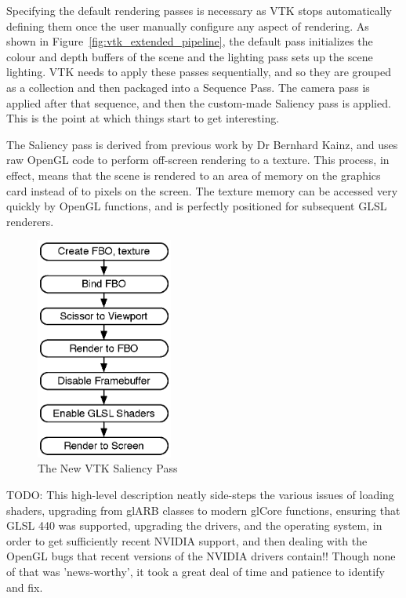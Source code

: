\documentclass[MSc,paper=a4,pagesize=auto]{icldt}
\begin{document}
Specifying the default rendering passes is necessary as VTK stops automatically defining them once the user manually configure any aspect of rendering. As shown in Figure~\ref{fig:vtk_extended_pipeline}, the default pass initializes the colour and depth buffers of the scene and the lighting pass sets up the scene lighting. VTK needs to apply these passes sequentially, and so they are grouped as a collection and then packaged into a Sequence Pass. The camera pass is applied after that sequence, and then the custom-made Saliency pass is applied. This is the point at which things start to get interesting.

The Saliency pass is derived from previous work by Dr Bernhard Kainz, and uses raw OpenGL code to perform off-screen rendering to a texture. This process, in effect, means that the scene is rendered to an area of memory on the graphics card instead of to pixels on the screen. The texture memory can be accessed very quickly by OpenGL functions, and is perfectly positioned for subsequent GLSL renderers.

\begin{figure}[htbp!]
    \centering
    \includegraphics[width=0.4\textwidth]{resources/vtk_saliency}
    \caption{The New VTK Saliency Pass}
    \label{fig:vtk_saliency}
\end{figure}

TODO: This high-level description neatly side-steps the various issues of loading shaders, upgrading from glARB classes to modern glCore functions, ensuring that GLSL 440 was supported, upgrading the drivers, and the operating system, in order to get sufficiently recent NVIDIA support, and then dealing with the OpenGL bugs that recent versions of the NVIDIA drivers contain!! Though none of that was 'news-worthy', it took a great deal of time and patience to identify and fix. 
\end{document}
